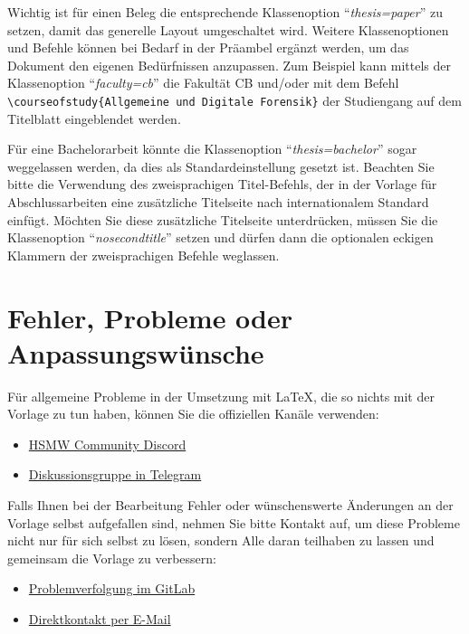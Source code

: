 \documentclass[
%
	thesis=paper,		%
	compactlistof,		%
	noauthorship,		%
%
	fancy,				%
%
%
]{hsmw-thesis}
\begin{document}
	Wichtig ist für einen Beleg die entsprechende Klassenoption \enquote{\textit{thesis=paper}} zu setzen, damit das generelle Layout umgeschaltet wird.
	Weitere Klassenoptionen und Befehle können bei Bedarf in der Präambel ergänzt werden, um das Dokument den eigenen Bedürfnissen anzupassen.
	Zum Beispiel kann mittels der Klassenoption \enquote{\textit{faculty=cb}} die Fakultät CB und/oder mit dem Befehl \verb|\courseofstudy{Allgemeine und Digitale Forensik}| der Studiengang auf dem Titelblatt eingeblendet werden.
	
	
	
	Für eine Bachelorarbeit könnte die Klassenoption \enquote{\textit{thesis=bachelor}} sogar weggelassen werden, da dies als Standardeinstellung gesetzt ist.
	Beachten Sie bitte die Verwendung des zweisprachigen Titel-Befehls, der in der Vorlage für Abschlussarbeiten eine zusätzliche Titelseite nach internationalem Standard einfügt.
	Möchten Sie diese zusätzliche Titelseite unterdrücken, müssen Sie die Klassenoption \enquote{\textit{nosecondtitle}} setzen und dürfen dann die optionalen eckigen Klammern der zweisprachigen Befehle weglassen.
	
	\section{Fehler, Probleme oder Anpassungswünsche}
	
	Für allgemeine Probleme in der Umsetzung mit LaTeX, die so nichts mit der Vorlage zu tun haben, können Sie die offiziellen Kanäle verwenden:
	\begin{itemize}
		\item \href{https://discord.com/channels/750860384126369822/765215969424834600}{HSMW Community Discord}
		\item \href{https://t.me/joinchat/Bxm0glfyeKXTM9OVlAhzJw}{Diskussionsgruppe in Telegram}
	\end{itemize}
	
	Falls Ihnen bei der Bearbeitung Fehler oder wünschenswerte Änderungen an der Vorlage selbst aufgefallen sind, nehmen Sie bitte Kontakt auf, um diese Probleme nicht nur für sich selbst zu lösen, sondern Alle daran teilhaben zu lassen und gemeinsam die Vorlage zu verbessern:
	\begin{itemize}
		\item \href{https://git.hs-mittweida.de/hsmw-latex/hsmw-thesis/-/issues}{Problemverfolgung im GitLab}
		\item \href{mailto:schildba@hs-mittweida.de?subject=[LaTeX] Vorlage Abschlussarbeiten}{Direktkontakt per E-Mail}
	\end{itemize}
	
\end{document}
